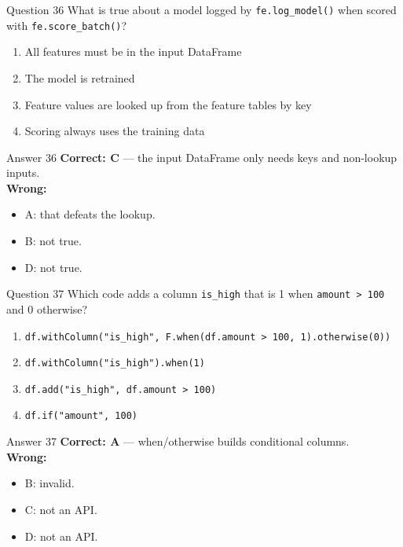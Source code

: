 \documentclass[aspectratio=169,11pt]{beamer}
\begin{document}
\begin{frame}{Question 36}
What is true about a model logged by \texttt{fe.log\_model()} when scored with \texttt{fe.score\_batch()}?
\begin{enumerate}[label=\Alph*.]
\item All features must be in the input DataFrame
\item The model is retrained
\item Feature values are looked up from the feature tables by key
\item Scoring always uses the training data
\end{enumerate}
\end{frame}
\begin{frame}{Answer 36}
\textbf{Correct: C} --- the input DataFrame only needs keys and non-lookup inputs.\\
\vspace{0.5em}
\textbf{Wrong:}
\begin{itemize}
\item A: that defeats the lookup.
\item B: not true.
\item D: not true.
\end{itemize}
\end{frame}

\begin{frame}{Question 37}
Which code adds a column \texttt{is\_high} that is 1 when \texttt{amount > 100} and 0 otherwise?
\begin{enumerate}[label=\Alph*.]
\item \texttt{df.withColumn("is\_high", F.when(df.amount > 100, 1).otherwise(0))}
\item \texttt{df.withColumn("is\_high").when(1)}
\item \texttt{df.add("is\_high", df.amount > 100)}
\item \texttt{df.if("amount", 100)}
\end{enumerate}
\end{frame}
\begin{frame}{Answer 37}
\textbf{Correct: A} --- when/otherwise builds conditional columns.\\
\vspace{0.5em}
\textbf{Wrong:}
\begin{itemize}
\item B: invalid.
\item C: not an API.
\item D: not an API.
\end{itemize}
\end{frame}
\end{document}
